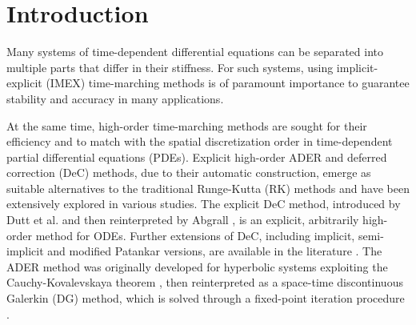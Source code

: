 \section{Introduction} 
\label{sec:introduction} 
Many systems of time-dependent differential equations can be separated into multiple parts that differ in their stiffness. For such systems, using implicit-explicit (IMEX) time-marching methods \cite{pareschi2000implicit} is of paramount importance to guarantee stability and accuracy in many applications.

At the same time, high-order time-marching methods are sought for their efficiency and to match with the spatial discretization order in time-dependent partial differential equations (PDEs). Explicit high-order ADER and deferred correction (DeC) methods, due to their automatic construction, emerge as suitable alternatives to the traditional Runge-Kutta (RK) methods and have been extensively explored in various studies.
The explicit DeC method, introduced by Dutt et al. \cite{dutt2000dec} and then reinterpreted by Abgrall \cite{abgrall2017dec}, is an explicit, arbitrarily high-order method for ODEs. Further extensions of DeC, including implicit, semi-implicit and modified Patankar versions, are available in the literature \cite{christlieb2010integral,minion2003dec,offner2019arbitrary,abgrall2022relaxation,layton2004conservative,speck2015multi}. 
The ADER method was originally developed for hyperbolic systems exploiting the Cauchy-Kovalevskaya theorem \cite{ADERHistorical2, ADERHistorical1,titarev2002ader}, then reinterpreted  as a space-time discontinuous Galerkin (DG) method, which is solved through a fixed-point iteration procedure \cite{ADERModern,zbMATH07627644,dumbser2007FVStiff,boscheri2014direct,micalizzi2023efficient,veiga2023improving,Han_Veiga_2021}.


